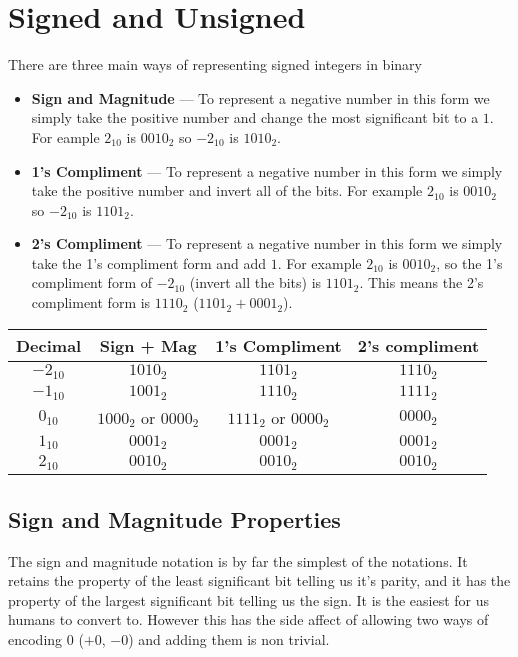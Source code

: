 \documentclass{article}
\begin{document}
\section{Signed and Unsigned}

There are three main ways of representing signed integers in binary

\begin{itemize}
	\item{
		\textbf{Sign and Magnitude} --- To represent a negative number in this form we simply take
		the positive number and change the most significant bit to a $1$. For eample $2_{10}$ is $0010_2$ so
		$-2_{10}$ is $1010_2$.
	}
	\item{
		\textbf{1's Compliment} --- To represent a negative number in this form we simply take the positive number
		and invert all of the bits. For example $2_{10}$ is $0010_2$ so $-2_{10}$ is $1101_2$.
	}
	\item{
		\textbf{2's Compliment} --- To represent a negative number in this form we simply take the 1's compliment form and add $1$.
		For example $2_{10}$ is $0010_2$, so the 1's compliment form of $-2_{10}$ (invert all the bits) is $1101_2$. This means
		the 2's compliment form is $1110_2$ ($1101_2 + 0001_2$).
	}
\end{itemize}

\begin{center}
  \begin{tabular}{ | c | c | c | c | }
    \hline
    Decimal & Sign + Mag & 1's Compliment & 2's compliment \\ \hline
    $-2_{10}$ & $1010_2$ & $1101_2$ & $1110_2$\\ \hline
    $-1_{10}$ & $1001_2$ & $1110_2$ & $1111_2$\\ \hline
    $0_{10}$ & $1000_2$ or $0000_2$ &  $1111_2$ or $0000_2$ & $0000_2$\\ \hline
    $1_{10}$ & $0001_2$ & $0001_2$ & $0001_2$\\ \hline
    $2_{10}$ & $0010_2$ & $0010_2$ & $0010_2$ \\
    \hline
  \end{tabular}
\end{center}

\subsection{Sign and Magnitude Properties}
The sign and magnitude notation is by far the simplest of the notations.
It retains the property of the least significant bit telling us it's
parity, and it has the property of the largest significant bit telling us
the sign. It is the easiest for us humans to convert to. However this has the side
affect of allowing two ways of encoding $0$ ($+0$, $-0$) and adding them is non trivial.
\end{document}
